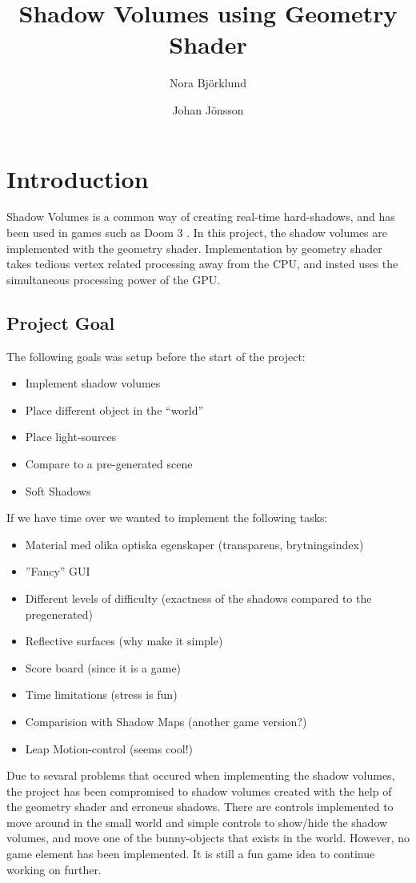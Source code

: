 \documentclass[a4paper, 12pt]{article}
\title{Shadow Volumes using Geometry Shader}
\author{Nora Björklund \and Johan Jönsson}
\begin{document}
\maketitle
\tableofcontents
\newpage
\section{Introduction}
Shadow Volumes is a common way of creating real-time hard-shadows, and has been used in games such as Doom 3 \cite{gpug1}. In this project, the shadow volumes are implemented with the geometry shader. Implementation by geometry shader takes tedious vertex related processing away from the CPU, and insted uses the simultaneous processing power of the GPU.
\subsection{Project Goal}
The following goals was setup before the start of the project:
\begin{itemize}
\item Implement shadow volumes
\item Place different object in the ``world''
\item Place light-sources
\item Compare to a pre-generated scene 
\item Soft Shadows
\end{itemize}
If we have time over we wanted to implement the following tasks:
\begin{itemize}
\item Material med olika optiska egenskaper (transparens, brytningsindex)
\item  ”Fancy” GUI
\item  Different levels of difficulty (exactness of the shadows compared to the pregenerated)
\item  Reflective surfaces (why make it simple)
\item  Score board (since it is a game)
\item  Time limitations (stress is fun)
\item  Comparision with Shadow Maps (another game version?)
\item  Leap Motion-control (seems cool!)
\end{itemize}

Due to sevaral problems that occured when implementing the shadow volumes, the project has been compromised to shadow volumes created with the help of the geometry shader and erroneus shadows. There are controls implemented to move around in the small world and simple controls to show/hide the shadow volumes, and move one of the bunny-objects that exists in the world. However, no game element has been implemented. It is still a fun game idea to continue working on further.
\end{document}
